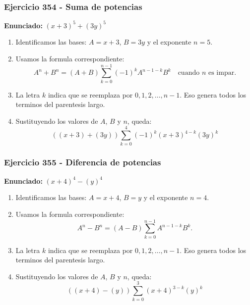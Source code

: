 \documentclass[11pt,a4paper]{article}
\begin{document}
\subsubsection*{Ejercicio 354 - Suma de potencias}
\textbf{Enunciado:} $ \left(x + 3\right)^{5}+\left(3 y\right)^{5} $\par
\begin{enumerate}[leftmargin=2em]
\item Identificamos las bases: \(A=x + 3\), \(B=3 y\) y el exponente \(n=5\).
\item Usamos la formula correspondiente: \[A^n+B^n=(A+B)\sum_{k=0}^{n-1}(-1)^kA^{n-1-k}B^k\quad\text{cuando }n\text{ es impar}.\]
\item La letra \(k\) indica que se reemplaza por \(0,1,2,\ldots,n-1\). Eso genera todos los terminos del parentesis largo.
\item Sustituyendo los valores de \(A\), \(B\) y \(n\), queda: \[\boxed{\left(\left(x + 3\right)+\left(3 y\right)\right)\sum_{k=0}^{4}(-1)^k\left(x + 3\right)^{4-k}\left(3 y\right)^k}\]
\end{enumerate}

\vspace{0.2cm}
\subsubsection*{Ejercicio 355 - Diferencia de potencias}
\textbf{Enunciado:} $ \left(x + 4\right)^{4}-\left(y\right)^{4} $\par
\begin{enumerate}[leftmargin=2em]
\item Identificamos las bases: \(A=x + 4\), \(B=y\) y el exponente \(n=4\).
\item Usamos la formula correspondiente: \[A^n-B^n=(A-B)\sum_{k=0}^{n-1}A^{n-1-k}B^k.\]
\item La letra \(k\) indica que se reemplaza por \(0,1,2,\ldots,n-1\). Eso genera todos los terminos del parentesis largo.
\item Sustituyendo los valores de \(A\), \(B\) y \(n\), queda: \[\boxed{\left(\left(x + 4\right)-\left(y\right)\right)\sum_{k=0}^{3}\left(x + 4\right)^{3-k}\left(y\right)^k}\]
\end{enumerate}

\vspace{0.2cm}
\end{document}

